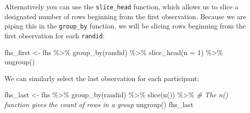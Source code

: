 \documentclass[
]{book}
\newenvironment{Shaded}{\begin{snugshade}}{\end{snugshade}}
\newcommand{\AttributeTok}[1]{\textcolor[rgb]{0.77,0.63,0.00}{#1}}
\newcommand{\CommentTok}[1]{\textcolor[rgb]{0.56,0.35,0.01}{\textit{#1}}}
\newcommand{\DecValTok}[1]{\textcolor[rgb]{0.00,0.00,0.81}{#1}}
\newcommand{\FunctionTok}[1]{\textcolor[rgb]{0.00,0.00,0.00}{#1}}
\newcommand{\NormalTok}[1]{#1}
\newcommand{\OtherTok}[1]{\textcolor[rgb]{0.56,0.35,0.01}{#1}}
\newcommand{\SpecialCharTok}[1]{\textcolor[rgb]{0.00,0.00,0.00}{#1}}
\begin{document}
Alternatively you can use the \texttt{slice\_head} function, which allows us to slice a designated number of rows beginning from the first observation. Because we are piping this in the \texttt{group\_by} function, we will be slicing rows beginning from the first observation for each \texttt{randid}:

\begin{Shaded}
\begin{Highlighting}[]
\NormalTok{fhs\_first }\OtherTok{\textless{}{-}}\NormalTok{ fhs }\SpecialCharTok{\%\textgreater{}\%} 
  \FunctionTok{group\_by}\NormalTok{(randid) }\SpecialCharTok{\%\textgreater{}\%} 
  \FunctionTok{slice\_head}\NormalTok{(}\AttributeTok{n =} \DecValTok{1}\NormalTok{) }\SpecialCharTok{\%\textgreater{}\%} 
  \FunctionTok{ungroup}\NormalTok{()}
\end{Highlighting}
\end{Shaded}

We can similarly select the last observation for each participant:

\begin{Shaded}
\begin{Highlighting}[]
\NormalTok{fhs\_last }\OtherTok{\textless{}{-}}\NormalTok{ fhs }\SpecialCharTok{\%\textgreater{}\%} 
  \FunctionTok{group\_by}\NormalTok{(randid) }\SpecialCharTok{\%\textgreater{}\%} 
  \FunctionTok{slice}\NormalTok{(}\FunctionTok{n}\NormalTok{()) }\SpecialCharTok{\%\textgreater{}\%} \CommentTok{\# The \textasciigrave{}n()\textasciigrave{} function gives the count of rows in a group }
  \FunctionTok{ungroup}\NormalTok{()}
\NormalTok{fhs\_last}
\end{Highlighting}
\end{Shaded}
\end{document}
